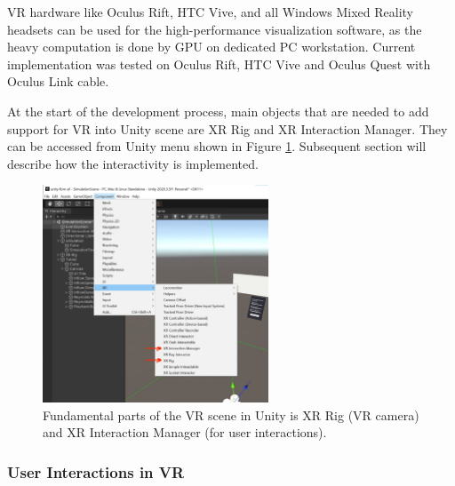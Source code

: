 VR hardware like Oculus Rift, HTC Vive, and all Windows Mixed Reality headsets can be used for the high-performance visualization software, as the heavy computation is done by GPU on dedicated PC workstation. Current implementation was tested on Oculus Rift, HTC Vive and Oculus Quest with Oculus Link cable.

At the start of the development process, main objects that are needed to add support for VR into Unity scene are XR Rig and XR Interaction Manager. They can be accessed from Unity menu shown in Figure \ref{fig:unity-xr-objects}. Subsequent section will describe how the interactivity is implemented.

\begin{figure}[!ht]
	\centering
	\includegraphics[width=0.6\textwidth]{figures/unity-add-xr-objects.jpg}
	\caption{Fundamental parts of the VR scene in Unity is XR Rig (VR camera) and XR Interaction Manager (for user interactions).}
	\label{fig:unity-xr-objects}
\end{figure}


\subsubsection{User Interactions in VR}\label{sec:interactivity}

